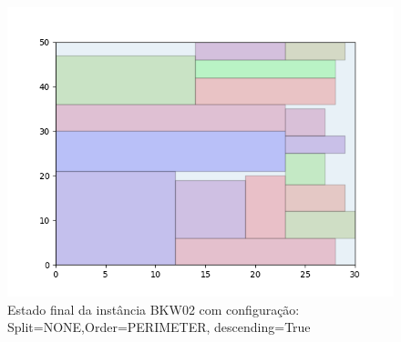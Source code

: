 \begin{figure}[H]
    \centering
    \caption[]{Estado final da instância BKW02 com configuração: Split=NONE,Order=PERIMETER, descending=True}
    \label{fig:bkw02-none-perimeter-true}
    \includegraphics[scale=0.5]{output/figures/bkw/bkw02/none/perimeter/true/00}
\end{figure}